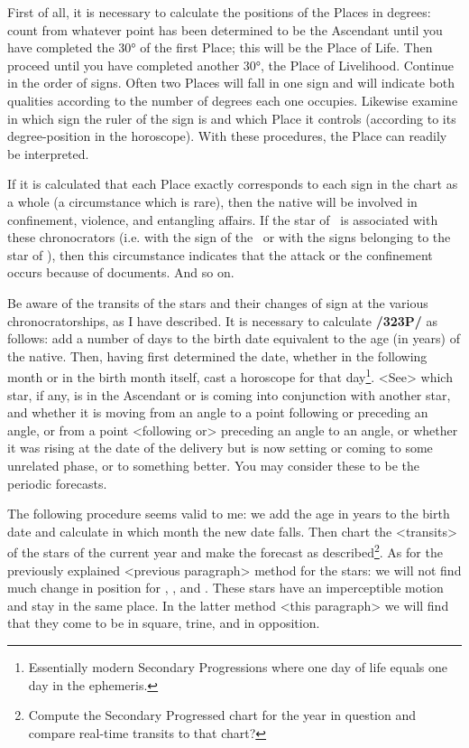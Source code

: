 First  of all, it is necessary to calculate the positions of the Places in degrees: count from whatever point has been determined to be the Ascendant until you have completed the 30° of the first Place; this will be the Place of Life. Then proceed until you have completed another 30°, the Place of Livelihood. Continue in the order of signs. Often two Places will fall in one sign and will indicate both qualities according to
the number of degrees each one occupies. Likewise examine in which sign the ruler of the sign is and which Place it controls (according to its degree-position in the horoscope). With these procedures, the
Place can readily be interpreted. 

If it is calculated that each Place exactly corresponds to each sign in the chart as a whole (a circumstance which is rare), then the native will be involved in confinement, violence, and entangling affairs. If the star of \Mercury\, is associated with these chronocrators (i.e. with the sign of the \Sun\, or with the signs belonging to the star of \Mars), then this circumstance indicates that the attack or the confinement
occurs because of documents. And so on.

 
Be aware of the transits of the stars and their changes of sign at the various chronocratorships, as I have described. It is necessary to calculate \textbf{/323P/} as follows: add a number of days to the birth date equivalent to the age (in years) of the native. Then, having first determined the date, whether in the following month or in the birth month itself, cast a horoscope for that day\footnote{Essentially modern Secondary Progressions where one day of life equals one day in the ephemeris.}. <See> which star, if any, is in the Ascendant or is coming into conjunction with another star, and whether it is moving from an angle to a point following or preceding an angle, or from a point <following or> preceding an angle to an angle, or whether it was rising at the date of the delivery but is now setting or coming to some unrelated phase, or to something better. You may consider these to be the periodic forecasts.

The following procedure seems valid to me: we add the age in years to the birth date and calculate in which month the new date falls. Then chart the <transits> of the stars of the current year and make the forecast as described\footnote{Compute the Secondary Progressed chart for the year in question and compare real-time transits to that chart?}. As for the previously explained <previous paragraph> method for the stars: we will not find much change in position for \Saturn, \Jupiter, and \Mars. These stars have an imperceptible motion and stay in the same place. In the latter method <this paragraph> we will find that they come to be in square, trine, and in opposition.

\newpage